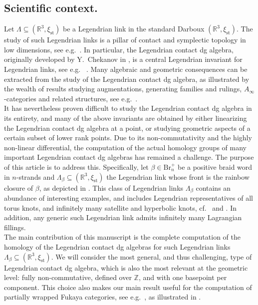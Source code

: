 \documentclass[11pt]{article}
\newcommand{\ZZ}{\mathbb Z}
\newcommand{\RR}{\mathbb R}
\newcommand{\La}{\Lambda}
\newcommand{\sse}{\subseteq}
\newcommand{\st}{\operatorname{st}}
\begin{document}
\subsection{ Scientific context.} Let $\La\sse(\RR^3,\xi_{\st})$ be a Legendrian link in the standard Darboux $(\RR^3,\xi_{\st})$. The study of such Legendrian links is a pillar of contact and symplectic topology in low dimensions, see e.g.~\cite{CasalsGao2022,CasalsGao2023,Chekanov2002,EliashbergPolterovich1996,EliashbergFraser2009,EtnyreHonda2005}. In particular, the Legendrian contact dg algebra, originally developed by Y.~Chekanov in \cite{Chekanov2002}, is a central Legendrian invariant for Legendrian links, see e.g.~ \cite{CasalsNg,Eliashberg2000,etnyre_ng_2020,Ng2008}. Many algebraic and geometric consequences can be extracted from the study of the Legendrian contact dg algebra, as illustrated by the wealth of results studying augmentations, generating families and rulings, $A_\infty$-categories and related structures, see e.g.~\cite{FuchsRutherford2011,FuchsIshkhanov2004,HenryRutherford2015,Leverson2016,Leverson2017,MelvinShrestha2005,NgRutherford2013,NgRutherfordShendeSivekZaslow2017,NgSabloff2006,Sabloff2005,Traynor2001}.\\

It has nevertheless proven difficult to study the Legendrian contact dg algebra in its entirety, and many of the above invariants are obtained by either linearizing the Legendrian contact dg algebra at a point, or studying geometric aspects of a certain subset of lower rank points. Due to its non-commutativity and the highly non-linear differential, the computation of the actual homology groups of many important Legendrian contact dg algebras has remained a challenge. The purpose of this article is to address this. Specifically, let $\beta\in\mbox{Br}_n^+$ be a positive braid word in $n$-strands and $\La_\beta\sse(\RR^3,\xi_{\st})$ the Legendrian link whose front is the rainbow closure of $\beta$, as depicted in . This class of Legendrian links $\La_\beta$ contains an abundance of interesting examples, and includes Legendrian representatives of all torus knots, and infinitely many satellite and hyperbolic knots, cf.~\cite[Corollary 1.6]{CasalsGao2022} and \cite{CasalsNg}. In addition, any generic such Legendrian link admits infinitely many Lagrangian fillings.\\

The main contribution of this manuscript is the complete computation of the homology of the Legendrian contact dg algebras for such Legendrian links $\La_\beta\sse(\RR^3,\xi_{\st})$. We will consider the most general, and thus challenging, type of Legendrian contact dg algebra, which is also the most relevant at the geometric level: fully non-commutative, defined over $\ZZ$, and with one basepoint per component. This choice also makes our main result useful for the computation of partially wrapped Fukaya categories, see e.g.~\cite{Ganatraetal2023,Sylvan2016}, as illustrated in .
\end{document}
